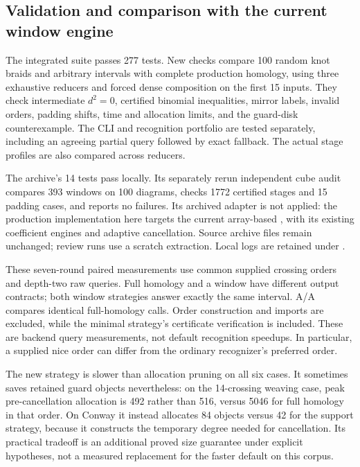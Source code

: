 \subsection{Validation and comparison with the current window engine}
The integrated suite passes 277 tests. New checks compare 100 random knot
braids and arbitrary intervals with complete production homology, using
three exhaustive reducers and forced dense composition on the first 15
inputs. They check intermediate $d^2=0$, certified binomial inequalities,
mirror labels, invalid orders, padding shifts, time and allocation limits,
and the guard-disk counterexample. The CLI and recognition portfolio are
tested separately, including an agreeing partial query followed by exact
fallback. The actual stage profiles are also compared across reducers.

The archive's 14 tests pass locally. Its separately rerun independent
cube audit compares 393 windows on 100 diagrams, checks 1772 certified
stages and 15 padding cases, and reports no failures. Its archived adapter
is not applied: the production implementation here targets the current
array-based , with its existing coefficient engines and
adaptive cancellation. Source archive files remain unchanged; review
runs use a scratch extraction. Local logs are retained under
.



These seven-round paired measurements use common supplied crossing orders
and depth-two raw queries. Full homology and a window have different
output contracts; both window strategies answer exactly the same interval.
A/A compares identical full-homology calls. Order construction and imports
are excluded, while the minimal strategy's certificate verification is
included. These are backend query measurements, not default recognition
speedups. In particular, a supplied nice order can differ from the ordinary
recognizer's preferred order.

The new strategy is slower than allocation pruning on all six cases.
It sometimes saves retained guard objects nevertheless: on the 14-crossing
weaving case, peak pre-cancellation allocation is 492 rather than 516,
versus 5046 for full homology in that order. On Conway it instead allocates
84 objects versus 42 for the support strategy, because it constructs the
temporary degree needed for cancellation. Its practical tradeoff is an
additional proved size guarantee under explicit hypotheses, not a measured
replacement for the faster default on this corpus.
